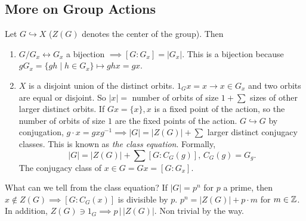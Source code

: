 \subsection{More on Group Actions}
Let $G \hookrightarrow X$ ($Z(G)$ denotes the center of the group). Then 
\begin{enumerate}
    \item $G /G_x \longleftrightarrow G_x$ a bijection $\implies [G:G_x]=|G_x|$. This is a bijection because $gG_x=\{gh \mid h\in G_x\} \mapsto ghx=gx$.
    \item $X$ is a disjoint union of the distinct orbits. $1_Gx=x \to x\in G_x$ and two orbits are equal or disjoint. So  $|x|=$ number of orbits of size $1+\sum$ sizes of other larger distinct orbits. If $Gx=\{x\} , x$ is a fixed point of the action, so the number of orbits of size $1$ are the fixed points of the action. $G \hookrightarrow G$ by conjugation, $g\cdot x=gxg^{-1} \implies |G|=|Z(G)|+\sum$ larger distinct conjugacy classes. This is known as \emph{the class equation}. Formally, \[
            |G|=|Z(G)|+\sum\left[  G:C_G(g)\right] , \, C_G(g)=G_g.
        \] The conjugacy class of $x\in G=Gx=[G:G_x]$.
\end{enumerate}
What can we tell from the class equation? If $|G|=p^n$ for $p$ a prime, then $x \notin Z(G) \implies \left[ G:C_G(x) \right] $ is divisible by $p$. $p^n=|Z(G)|+p\cdot m$ for $m\in \mathbb{Z}$. In addition, $Z(G) \ni 1_G \implies p \, \big| \, |Z(G)|$. Non trivial by the way.


